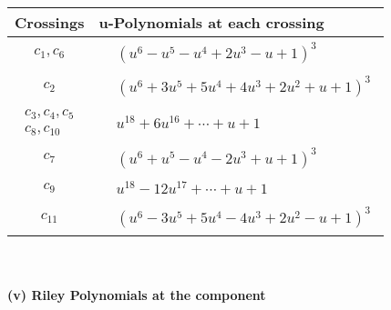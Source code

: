 \documentclass[1p]{elsarticle_modified}
\theoremstyle{definition}
\begin{document}
\begin{tabular}{m{50pt}|m{274pt}}
Crossings & \hspace{64pt}u-Polynomials at each crossing \\
\hline $$\begin{aligned}c_{1},c_{6}\end{aligned}$$&$\begin{aligned}
&(u^6- u^5- u^4+2 u^3- u+1)^3
\end{aligned}$\\
\hline $$\begin{aligned}c_{2}\end{aligned}$$&$\begin{aligned}
&(u^6+3 u^5+5 u^4+4 u^3+2 u^2+u+1)^3
\end{aligned}$\\
\hline $$\begin{aligned}c_{3},c_{4},c_{5}\\c_{8},c_{10}\end{aligned}$$&$\begin{aligned}
&u^{18}+6 u^{16}+\cdots+u+1
\end{aligned}$\\
\hline $$\begin{aligned}c_{7}\end{aligned}$$&$\begin{aligned}
&(u^6+u^5- u^4-2 u^3+u+1)^3
\end{aligned}$\\
\hline $$\begin{aligned}c_{9}\end{aligned}$$&$\begin{aligned}
&u^{18}-12 u^{17}+\cdots+u+1
\end{aligned}$\\
\hline $$\begin{aligned}c_{11}\end{aligned}$$&$\begin{aligned}
&(u^6-3 u^5+5 u^4-4 u^3+2 u^2- u+1)^3
\end{aligned}$\\
\hline
\end{tabular}\\~\\
\newpage\renewcommand{\arraystretch}{1}
\flushleft \textbf{(v) Riley Polynomials at the component}\newline \\
\end{document}
